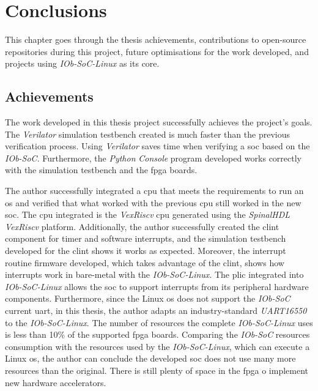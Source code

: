 \chapter{Conclusions}
\label{chapter:conclusions}
This chapter goes through the thesis achievements, contributions to open-source repositories during this project, future optimisations for the work developed, and projects using \textit{IOb-SoC-Linux} as its core.

\section{Achievements}
\label{section:achievements}
The work developed in this thesis project successfully achieves the project's goals. The \textit{Verilator} simulation testbench created is much faster than the previous verification process. Using \textit{Verilator} saves time when verifying a \acrshort{soc} based on the \textit{IOb-SoC}. Furthermore, the \textit{Python} \textit{Console} program developed works correctly with the simulation testbench and the \acrshort{fpga} boards.

The author successfully integrated a \acrshort{cpu} that meets the requirements to run an \acrshort{os} and verified that what worked with the previous \acrshort{cpu} still worked in the new \acrshort{soc}. The \acrshort{cpu} integrated is the \textit{VexRiscv} \acrshort{cpu} generated using the \textit{SpinalHDL} \textit{VexRiscv} platform. Additionally, the author successfully created the \acrshort{clint} component for timer and software interrupts, and the simulation testbench developed for the \acrshort{clint} shows it works as expected. Moreover, the interrupt routine firmware developed, which takes advantage of the \acrshort{clint}, shows how interrupts work in bare-metal with the \textit{IOb-SoC-Linux}. The \acrshort{plic} integrated into \textit{IOb-SoC-Linux} allows the \acrshort{soc} to support interrupts from its peripheral hardware components. Furthermore, since the Linux \acrshort{os} does not support the \textit{IOb-SoC} current \acrshort{uart}, in this thesis, the author adapts an industry-standard \textit{UART16550} to the \textit{IOb-SoC-Linux}. The number of resources the complete \textit{IOb-SoC-Linux} uses is less than 10\% of the supported \acrshort{fpga} boards. Comparing the \textit{IOb-SoC} resources consumption with the resources used by the \textit{IOb-SoC-Linux}, which can execute a Linux \acrshort{os}, the author can conclude the developed \acrshort{soc} does not use many more resources than the original. There is still plenty of space in the \acrshort{fpga} o implement new hardware accelerators.

